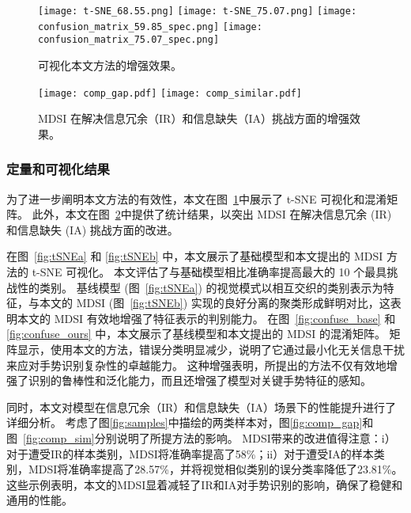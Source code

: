 \begin{figure}
  \centering
    {\texttt{[image: t-SNE\_68.55.png]}}
    {\texttt{[image: t-SNE\_75.07.png]}}
    {\texttt{[image: confusion\_matrix\_59.85\_spec.png]}}
    {\texttt{[image: confusion\_matrix\_75.07\_spec.png]}}
  \caption{可视化本文方法的增强效果。}
  \label{fig:vis}
\end{figure}

\begin{figure}
  \centering
    {\texttt{[image: comp\_gap.pdf]}}
    {\texttt{[image: comp\_similar.pdf]}}
  \caption{MDSI 在解决信息冗余（IR）和信息缺失（IA）挑战方面的增强效果。}
  \label{fig:comp}
\end{figure}

\subsubsection{定量和可视化结果}
为了进一步阐明本文方法的有效性，本文在图~\ref{fig:vis}中展示了 t-SNE 可视化和混淆矩阵。
此外，本文在图~\ref{fig:comp}中提供了统计结果，以突出 MDSI 在解决信息冗余 (IR) 和信息缺失 (IA) 挑战方面的改进。

在图~\ref{fig:tSNEa} 和 \ref{fig:tSNEb} 中，本文展示了基础模型和本文提出的 MDSI 方法的 t-SNE 可视化。
本文评估了与基础模型相比准确率提高最大的 10 个最具挑战性的类别。
基线模型 (图~\ref{fig:tSNEa}) 的视觉模式以相互交织的类别表示为特征，与本文的 MDSI (图~\ref{fig:tSNEb}) 实现的良好分离的聚类形成鲜明对比，这表明本文的 MDSI 有效地增强了特征表示的判别能力。
在图~\ref{fig:confuse_base} 和 \ref{fig:confuse_ours} 中，本文展示了基线模型和本文提出的 MDSI 的混淆矩阵。
矩阵显示，使用本文的方法，错误分类明显减少，说明了它通过最小化无关信息干扰来应对手势识别复杂性的卓越能力。
这种增强表明，所提出的方法不仅有效地增强了识别的鲁棒性和泛化能力，而且还增强了模型对关键手势特征的感知。

同时，本文对模型在信息冗余（IR）和信息缺失（IA）场景下的性能提升进行了详细分析。
考虑了图\ref{fig:samples}中描绘的两类样本对，图\ref{fig:comp_gap}和图~\ref{fig:comp_sim}分别说明了所提方法的影响。
MDSI带来的改进值得注意：i）对于遭受IR的样本类别，MDSI将准确率提高了58\%；ii）对于遭受IA的样本类别，MDSI将准确率提高了28.57\%，并将视觉相似类别的误分类率降低了23.81\%。
这些示例表明，本文的MDSI显着减轻了IR和IA对手势识别的影响，确保了稳健和通用的性能。


